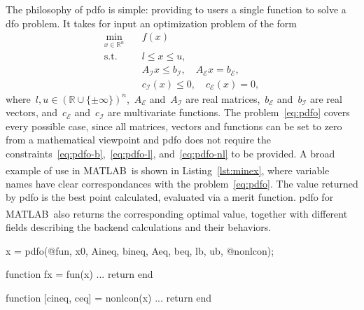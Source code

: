 \documentclass[11pt,draft]{article}
\numberwithin{equation}{section}
\def\R{\ensuremath{\mathbb{R}}}
\newcommand\set[2][]{#1\{#2#1\}}
\def\obj{\ensuremath{f}}
\def\bl{\ensuremath{l}}
\def\bu{\ensuremath{u}}
\newcommand\cgen[1][i]{c_{#1}}
\def\ceq{\ensuremath{\cgen[\scriptscriptstyle\mathcal{E}]}}
\def\cub{\ensuremath{\cgen[\scriptscriptstyle\mathcal{I}]}}
\def\aeq{\ensuremath{A_{\scriptscriptstyle\mathcal{E}}}}
\def\beq{\ensuremath{b_{\scriptscriptstyle\mathcal{E}}}}
\def\aub{\ensuremath{A_{\scriptscriptstyle\mathcal{I}}}}
\def\bub{\ensuremath{b_{\scriptscriptstyle\mathcal{I}}}}
\def\matlab{\mbox{MATLAB\textsuperscript{\textregistered}}}
\begin{document}
The philosophy of \gls{pdfo} is simple: providing to users a single function to solve a \gls{dfo} problem.
It takes for input an optimization problem of the form
\begin{subequations}
    \label{eq:pdfo}
    \begin{align}
        \min_{x \in \R^n}   & \quad \obj(x)\\
        \text{s.t.}         & \quad \bl \le x \le \bu, \label{eq:pdfo-b}\\
        & \quad \aub x \le \bub, \quad \aeq x = \beq, \label{eq:pdfo-l}\\
        & \quad \cub(x) \le 0, \quad \ceq(x) = 0, \label{eq:pdfo-nl}
    \end{align}
\end{subequations}
where~$\bl, \bu \in (\R \cup \set{\pm \infty})^n$,~$\aeq$ and~$\aub$ are real matrices,~$\beq$ and~$\bub$ are real vectors, and~$\ceq$ and~$\cub$ are multivariate functions.
The problem~\eqref{eq:pdfo} covers every possible case, since all matrices, vectors and functions can be set to zero from a mathematical viewpoint and \gls{pdfo} does not require the constraints~\eqref{eq:pdfo-b},~\eqref{eq:pdfo-l}, and~\eqref{eq:pdfo-nl} to be provided.
A broad example of use in \matlab\ is shown in Listing~\ref{lst:minex}, where variable names have clear correspondances with the problem~\eqref{eq:pdfo}.
The value returned by \gls{pdfo} is the best point calculated, evaluated via a merit function.
\gls{pdfo} for \matlab\ also returns the corresponding optimal value, together with different fields describing the backend calculations and their behaviors.

\begin{matlablst}[%
    caption=An elementary example of PDFO in \matlab.,
    label=lst:minex
]
    x = pdfo(@fun, x0, Aineq, bineq, Aeq, beq, lb, ub, @nonlcon);

    function fx = fun(x)
    ...
    return
    end

    function [cineq, ceq] = nonlcon(x)
    ...
    return
    end
\end{matlablst}
\end{document}

